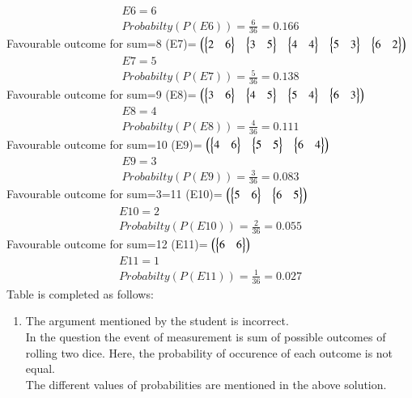 \begin{enumerate}[label=\arabic*.,ref=\thesubsubsection.\theenumi]
\begin{enumerate}
\begin{align}
E6=6
\\
Probabilty(P(E6))=\frac{6}{36}=0.166
\end{align}
Favourable outcome for sum=8 (E7)= 
$\begin{pmatrix}\begin{Bmatrix}2&6\end{Bmatrix}&\begin{Bmatrix}3&5\end{Bmatrix}&\begin{Bmatrix}4&4\end{Bmatrix}&\begin{Bmatrix}5&3\end{Bmatrix}&\begin{Bmatrix}6&2\end{Bmatrix}\end{pmatrix}$
\begin{align}
E7=5
\\
Probabilty(P(E7))=\frac{5}{36}=0.138
\end{align}
Favourable outcome for sum=9 (E8)= 
$\begin{pmatrix}\begin{Bmatrix}3&6\end{Bmatrix}&\begin{Bmatrix}4&5\end{Bmatrix}&\begin{Bmatrix}5&4\end{Bmatrix}&\begin{Bmatrix}6&3\end{Bmatrix}\end{pmatrix}$
\begin{align}
E8=4
\\
Probabilty(P(E8))=\frac{4}{36}=0.111
\end{align}
Favourable outcome for sum=10 (E9)= 
$\begin{pmatrix}\begin{Bmatrix}4&6\end{Bmatrix}&\begin{Bmatrix}5&5\end{Bmatrix}&\begin{Bmatrix}6&4\end{Bmatrix}\end{pmatrix}$
\begin{align}
E9=3 
\\
Probabilty(P(E9))=\frac{3}{36}=0.083
\end{align}
Favourable outcome for sum=3=11 (E10)= 
$\begin{pmatrix}\begin{Bmatrix}5&6\end{Bmatrix}&\begin{Bmatrix}6&5\end{Bmatrix}\end{pmatrix}$
\begin{align}
E10=2
\\
Probabilty(P(E10))=\frac{2}{36}=0.055
\end{align}
Favourable outcome for sum=12 (E11)=
$\begin{pmatrix}\begin{Bmatrix}6&6\end{Bmatrix}\end{pmatrix}$
\begin{align}
E11=1
\\
Probabilty(P(E11))=\frac{1}{36}=0.027
\end{align}
Table is completed as follows:
\end{enumerate}
\begin{enumerate}
\item The argument mentioned by the student is incorrect.
\\
In the question the event of measurement is sum of possible outcomes of rolling two dice.
Here, the probability of occurence of each outcome is not equal. 
\\
The different values of probabilities are mentioned in the above solution.
\\

\end{enumerate}
\end{enumerate}
